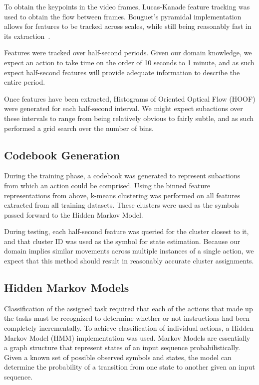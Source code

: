 \documentclass[10pt,twocolumn,letterpaper]{article}
\begin{document}
To obtain the keypoints in the video frames, Lucas-Kanade feature tracking was used to obtain the flow between frames. Bouguet's pyramidal implementation allows for features to be tracked across scales, while still being reasonably fast in its extraction~\cite{bouguet2001pyramidal}.

Features were tracked over half-second periods. Given our domain knowledge, we expect an action to take time on the order of 10 seconds to 1 minute, and as such expect half-second features will provide adequate information to describe the entire period.

Once features have been extracted, Histograms of Oriented Optical Flow (HOOF) were generated for each half-second interval. We might expect subactions over these intervals to range from being relatively obvious to fairly subtle, and as such performed a grid search over the number of bins.

\subsection{Codebook Generation}
During the training phase, a codebook was generated to represent subactions from which an action could be comprised. Using the binned feature representations from above, k-means clustering was performed on all features extracted from all training datasets. These clusters were used as the symbols passed forward to the Hidden Markov Model.

During testing, each half-second feature was queried for the cluster closest to it, and that cluster ID was used as the symbol for state estimation. Because our domain implies similar movements across multiple instances of a single action, we expect that this method should result in reasonably accurate cluster assignments.

\subsection{Hidden Markov Models}
Classification of the assigned task required that each of the actions that made up the tasks must be recognized to determine whether or not instructions had been completely incrementally. To achieve classification of individual actions, a Hidden Markov Model (HMM) implementation was used. Markov Models are essentially a graph structure that represent states of an input sequence probabilistically. Given a known set of possible observed symbols and states, the model can determine the probability of a transition from one state to another given an input sequence.
\end{document}
